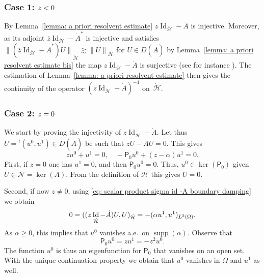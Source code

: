\documentclass[JEP,XML,SOM,Unicode,published]{cedram}
\theoremstyle{plain}
\theoremstyle{definition}
\let \Re \relax
\DeclareMathOperator{\Re}{Re}
\newcommand{\ovl}[1]{\overline{#1}}
\newcommand{\inp}[2]{(#1, #2)}
\renewcommand{\H}{{\mathcal H}}
\newcommand{\transp}{\ensuremath{\phantom{}^{t}}}
\newcommand{\Norm}[2]{{\| #1 \|}_{#2}}
\newcommand{\Pell}{\mathsf P_0}
\DeclareMathOperator{\id}{Id}
\DeclareMathOperator{\supp}{supp}
\begin{document}
\subsubsection*{Case 1: ${\Re z <0}$}
By Lemma~\ref{lemma: a priori resolvent estimate}
$z \id_{\dot{\H}} - \dot{A}$ is injective. Moreover, as its adjoint
$\ovl{z} \id_{\dot{\H}} - \dot{A}^*$ is injective and satisfies $\Norm{(\ovl{z} \id_{\dot{\H}} - \dot{A}^*) U}{\dot{\H}} \gtrsim \Norm{U}{\dot{\H}}$ for $U \in
D(\dot{A})$ by Lemma~\ref{lemma: a priori resolvent estimate
bis} the map
$z \id_{\dot{\H}} - \dot{A}$ is surjective (see for instance \cite[Th.\,2.20]{Brezis:11}). The estimation of
Lemma~\ref{lemma: a priori resolvent estimate} then gives the
continuity of the operator $(z \id_{\dot{\H}} - \dot{A})^{-1}$ on~$\dot{\H}$.

\subsubsection*{Case 2: ${\Re z =0}$}
We start by proving the injectivity of $z \id_{\dot{\H}} - \dot{A}$.
Let thus $U =\transp (u^0,u^1) \in D(\dot{A})$ be such that $z U - \dot{A}U=0$.
This gives
\begin{equation}
\label{eq: injectivity sigma - A boundary damping}
z u^0 +u^1 =0, \quad
- \Pell u^0 + (z-\alpha) u^1 =0.
\end{equation}
First, if $z=0$ one has $u^1=0$, and then $\Pell u^0=0$. Thus,
$u^0 \in \ker(\Pell)$ given $U \in \mathcal N = \ker(A)$. From
the definition of $\dot \H$ this gives $U=0$.

Second,
if now $z \neq 0$, using \eqref{eq: scalar product sigma id -A
boundary damping} we obtain
\begin{equation*}
0 = \Re \inp{(z \id_{\dot{\H}} - \dot{A})U}{U}_{\dot{\H}}
= - \inp{\alpha u^1}{u^1}_{L^2 (\Omega)}.
\end{equation*}
As $\alpha\geq 0$, this implies that $u^0$ vanishes a.e.\ on $\supp(\alpha)$.
Observe that
\begin{equation*}
\Pell u^0 = z u^1 = -z^2 u^0.
\end{equation*}
The function $u^0$ is thus an eigenfunction for $\Pell$ that
vanishes on an open set.
With the unique continuation property we obtain that
$u^0$ vanishes in $\Omega$ and $u^1$ as well.
\end{document}
